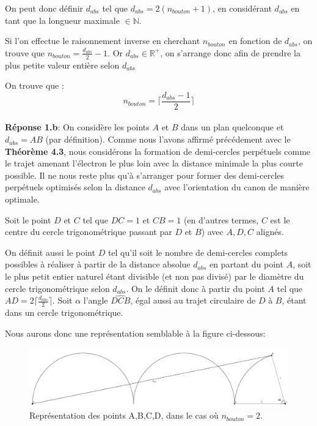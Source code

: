 \documentclass{amsart}
\theoremstyle{definition}
\theoremstyle{remark}
\numberwithin{equation}{section}
\begin{document}
On peut donc définir $d_{abs}$ tel que $d_{abs}=2(n_{bouton}+1)$, en considérant $d_{abs}$ en tant que la longueur maximale $\in\mathbb{N}$.

Si l'on effectue le raisonnement inverse en cherchant $n_{bouton}$ en fonction de $d_{abs}$, on trouve que $n_{bouton}=\frac{d_{abs}}{2}-1$. Or $d_{abs}\in\mathbb{R^+}$, on s'arrange donc afin de prendre la plus petite valeur entière selon $d_{abs}$

On trouve que : 
\[n_{bouton}=\lceil \frac{d_{abs}-1}{2} \rceil\]\\

\textbf{Réponse 1.b}: On considère les points $A$ et $B$ dans un plan quelconque et $d_{abs}=AB$ (par définition). Comme nous l'avons affirmé précédement avec le \textbf{Théorème 4.3}, nous considérons la formation de demi-cercles perpétuels comme le trajet amenant l'électron le plus loin avec la distance minimale la plus courte possible. Il ne nous reste plus qu'à s'arranger pour former des demi-cercles perpétuels optimisés selon la distance $d_{abs}$ avec l'orientation du canon de manière optimale.

Soit le point $D$ et $C$ tel que $DC=1$ et $CB=1$ (en d'autres termes, $C$ est le centre du cercle trigonométrique passant par $D$ et $B$) avec $A,D,C$ alignés.

On définit aussi le point $D$ tel qu'il soit le nombre de demi-cercles complets possibles à réaliser à partir de la distance absolue $d_{abs}$ en partant du point $A$, soit le plus petit entier naturel étant divisible (et non pas divisé) par le diamètre du cercle trigonométrique selon $d_{abs}$. On le définit donc à partir du point $A$ tel que $AD=2\lceil\frac{d_{abs}}{2}\rceil$. Soit $\alpha$ l'angle $\widehat{DCB}$, égal aussi au trajet circulaire de $D$ à $B$, étant dans un cercle trigonométrique. 

Nous aurons donc une représentation semblable à la figure ci-dessous:

\begin{figure}[H]
    \centering
    \includegraphics[scale=0.2]{dmin.png}
    \caption{Représentation des points A,B,C,D, dans le cas où $n_{bouton}=2$.}
\end{figure}
\end{document}
